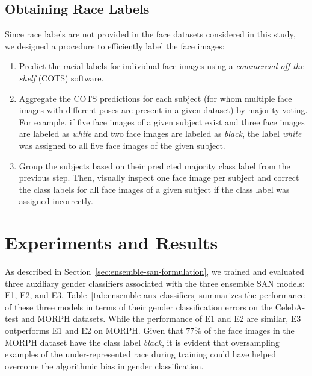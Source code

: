 \documentclass[10pt,twocolumn,letterpaper]{article}
\begin{document}
\subsection{Obtaining Race Labels}

Since race labels are not provided in the face datasets considered in this study, we designed a procedure to efficiently label the face images:
\begin{enumerate}[noitemsep]
\item Predict the racial labels for individual face images using a \textit{commercial-off-the-shelf} (COTS) software.
\item Aggregate the COTS predictions for each subject (for whom multiple face images with different poses are present in a given dataset) by majority voting. For example, if five face images of a given subject exist and three face images are labeled as \textit{white} and two face images are labeled as \textit{black}, the label \textit{white} was assigned to all five face images of the given subject.
\item Group the subjects based on their predicted majority class label from the previous step. Then, visually inspect one face image per subject and correct the class labels for all face images of a given subject if the class label was assigned incorrectly.
\end{enumerate}


\section{Experiments and Results}

As described in Section~\ref{sec:ensemble-san-formulation}, we trained and evaluated three auxiliary gender classifiers associated with the three ensemble SAN models: E1, E2, and E3. 
Table~\ref{tab:ensemble-aux-classifiers} summarizes the performance of these three models in terms of their gender classification errors on the CelebA-test and MORPH datasets. While the performance of E1 and E2 are similar, E3 outperforms E1 and E2 on MORPH. Given that $77\%$ of the face images in the MORPH dataset have the class label {\em black}, it is evident that oversampling examples of the under-represented race during training could have helped overcome the algorithmic bias in gender classification. %

\end{document}
